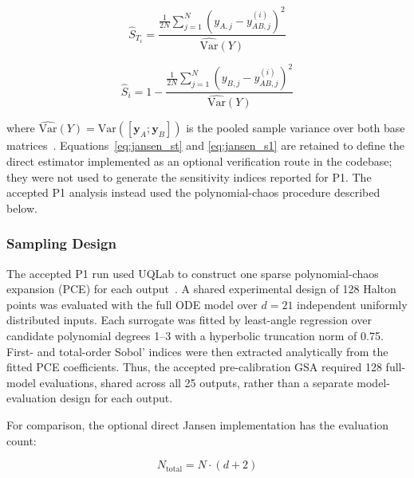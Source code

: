 \documentclass{article}
\begin{document}
\begin{equation}
    \hat{S}_{T_i}
    = \frac{\frac{1}{2N}
            \sum_{j=1}^{N}
            \left(y_{A,j} - y_{AB,j}^{(i)}\right)^2}
           {\widehat{\mathrm{Var}}(Y)}
    \label{eq:jansen_st}
\end{equation}

\begin{equation}
    \hat{S}_i
    = 1 -
      \frac{\frac{1}{2N}
            \sum_{j=1}^{N}
            \left(y_{B,j} - y_{AB,j}^{(i)}\right)^2}
           {\widehat{\mathrm{Var}}(Y)}
    \label{eq:jansen_s1}
\end{equation}

\noindent where $\widehat{\mathrm{Var}}(Y) = \mathrm{Var}([\mathbf{y}_A;
\mathbf{y}_B])$ is the pooled sample variance over both base
matrices~\cite{Jansen1999}. Equations~\eqref{eq:jansen_st} and
\eqref{eq:jansen_s1} are retained to define the direct estimator implemented as
an optional verification route in the codebase; they were not used to generate
the sensitivity indices reported for P1. The accepted P1 analysis instead used
the polynomial-chaos procedure described below.

\subsubsection{Sampling Design}
\label{sec:gsa_sampling}

The accepted P1 run used UQLab to construct one sparse polynomial-chaos
expansion (PCE) for each output~\cite{Marelli2014,Blatman2011}. A shared
experimental design of 128 Halton points was evaluated with the full ODE model
over $d=21$ independent uniformly distributed inputs. Each surrogate was fitted
by least-angle regression over candidate polynomial degrees 1--3 with a
hyperbolic truncation norm of 0.75. First- and total-order Sobol' indices were
then extracted analytically from the fitted PCE coefficients. Thus, the accepted
pre-calibration GSA required 128 full-model evaluations, shared across all 25
outputs, rather than a separate model-evaluation design for each output.

For comparison, the optional direct Jansen implementation has the evaluation
count:

\begin{equation}
    N_\mathrm{total} = N \cdot (d + 2)
    \label{eq:ntotal}
\end{equation}
\end{document}
